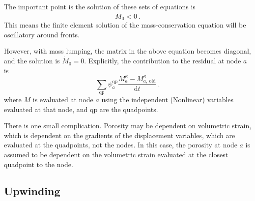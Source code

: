 \documentclass[12pt]{report}
\def\species{\kappa}
\def\d{\mathrm{d}}
\begin{document}
The important point is the solution of these sets of equations is
\begin{equation}
\dot{M}_{0} < 0 \ .
\end{equation}
This means the finite element solution of the mass-conservation
equation will be oscillatory around fronts.

However, with mass lumping, the matrix in the above
equation becomes diagonal, and the solution is $\dot{M}_{0} =
0$.  Explicitly, the contribution to the residual at node $a$ is
\begin{equation}
\sum_{\mathrm{qp}}\psi_{a}^{\mathrm{qp}} \frac{M_{a}^{\species} -
  M^{\species}_{a,\ \mathrm{old}}}{\d t} \ .
\end{equation}
where $M$ is evaluated at node $a$ using the independent (Nonlinear)
variables evaluated at that node, and qp are the quadpoints.

There is one small complication.  Porosity may be dependent on
volumetric strain, which is dependent on the gradients of the
displacement variables, which are evaluated at the quadpoints, not the
nodes.  In this case, the porosity at node $a$ is assumed to be
dependent on the volumetric strain evaluated at the closest quadpoint
to the node.

\subsection{Upwinding}
\end{document}
